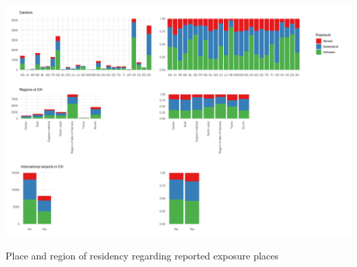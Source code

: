 \documentclass[10pt, a4paper, twoside]{article}
\begin{document}
\clearpage
\begin{suppfigure}[h]
\centering
\includegraphics[scale=0.4]{SF3_2021-04-30.pdf}
\caption{Place and region of residency regarding reported exposure places}
\label{sf3}
\end{suppfigure}
\end{document}
